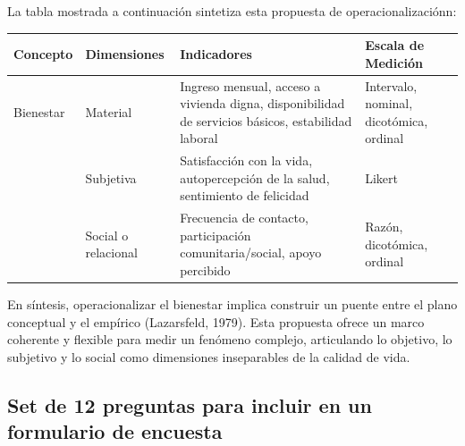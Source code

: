 \documentclass{article}
\begin{document}
\noindent La tabla mostrada a continuación sintetiza esta propuesta de operacionalizaciónn:\\

\begin{center}
	\begin{tabular}{| m{2cm} | m{2cm}| m{6cm} | m{4cm} |} 
		\hline
		Concepto & Dimensiones & Indicadores & Escala de Medición \\ [0.5ex] 
		\hline\hline
		Bienestar & Material & Ingreso mensual, acceso a vivienda digna, disponibilidad de servicios básicos, estabilidad laboral & Intervalo, nominal, dicotómica, ordinal \\ 
		\hline
		 & Subjetiva & Satisfacción con la vida, autopercepción de la salud, sentimiento de felicidad & Likert \\
		\hline
		 & Social o relacional & Frecuencia de contacto, participación comunitaria/social, apoyo percibido & Razón, dicotómica, ordinal \\ [1ex]
		\hline
	\end{tabular}
\end{center}

\noindent En síntesis, operacionalizar el bienestar implica construir un puente entre el plano conceptual y el empírico (Lazarsfeld, 1979). Esta propuesta ofrece un marco coherente y flexible para medir un fenómeno complejo, articulando lo objetivo, lo subjetivo y lo social como dimensiones inseparables de la calidad de vida.\\

\subsection*{Set de 12 preguntas para incluir en un formulario de encuesta}
\end{document}
